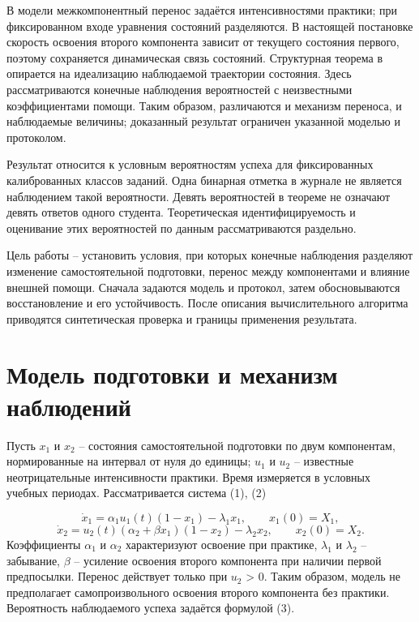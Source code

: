 \documentclass[blind]{psta}
\begin{document}
В модели \cite{ref12} межкомпонентный перенос задаётся интенсивностями практики; при фиксированном входе уравнения состояний разделяются. В настоящей постановке скорость освоения второго компонента зависит от текущего состояния первого, поэтому сохраняется динамическая связь состояний. Структурная теорема в \cite{ref12} опирается на идеализацию наблюдаемой траектории состояния. Здесь рассматриваются конечные наблюдения вероятностей с неизвестными коэффициентами помощи. Таким образом, различаются и механизм переноса, и наблюдаемые величины; доказанный результат ограничен указанной моделью и протоколом.

Результат относится к условным вероятностям успеха для фиксированных калиброванных классов заданий. Одна бинарная отметка в журнале не является наблюдением такой вероятности. Девять вероятностей в теореме не означают девять ответов одного студента. Теоретическая идентифицируемость и оценивание этих вероятностей по данным рассматриваются раздельно.

Цель работы – установить условия, при которых конечные наблюдения разделяют изменение самостоятельной подготовки, перенос между компонентами и влияние внешней помощи. Сначала задаются модель и протокол, затем обосновываются восстановление и его устойчивость. После описания вычислительного алгоритма приводятся синтетическая проверка и границы применения результата.

\FloatBarrier
\section{Модель подготовки и механизм наблюдений}
Пусть $x_{1}$ и $x_{2}$ – состояния самостоятельной подготовки по двум компонентам, нормированные на интервал от нуля до единицы; $u_{1}$ и $u_{2}$ – известные неотрицательные интенсивности практики. Время измеряется в условных учебных периодах. Рассматривается система (1), (2)

\begin{equation}
\dot x_1=\alpha_1u_1(t)(1-x_1)-\lambda_1x_1,\qquad x_1(0)=X_1,
\tag{1}
\label{eq:1}
\end{equation}
\begin{equation}
\dot x_2=u_2(t)(\alpha_2+\beta x_1)(1-x_2)-\lambda_2x_2,\qquad x_2(0)=X_2.
\tag{2}
\label{eq:2}
\end{equation}
Коэффициенты $\alpha_{1}$ и $\alpha_{2}$ характеризуют освоение при практике, $\lambda_{1}$ и $\lambda_{2}$ – забывание, $\beta$ – усиление освоения второго компонента при наличии первой предпосылки. Перенос действует только при $u_{2}$ > 0. Таким образом, модель не предполагает самопроизвольного освоения второго компонента без практики. Вероятность наблюдаемого успеха задаётся формулой (3).
\end{document}
